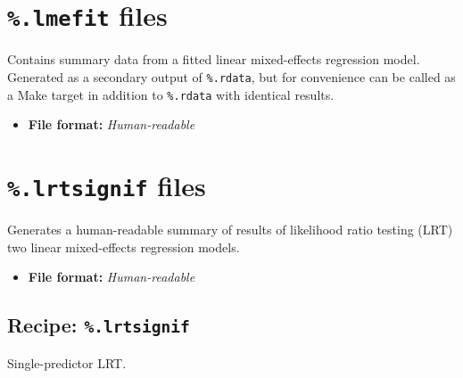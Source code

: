 \documentclass[12pt]{report}
\def\blue{\color{blue}}
\begin{document}
\section{{\blue\tt \%.lmefit} files}

Contains summary data from a fitted linear mixed-effects regression model. Generated as a secondary output of {\blue\tt \%.rdata}, but for convenience can be called as a Make target in addition to {\blue \tt \%.rdata} with identical results.

\begin{itemize}
\item\textbf{File format:} \textit{Human-readable}
\end{itemize}

\section{{\blue\tt \%.lrtsignif} files}

Generates a human-readable summary of results of likelihood ratio testing (LRT) two linear mixed-effects regression models.

\begin{itemize}
\item\textbf{File format:} \textit{Human-readable}
\end{itemize}

\subsection{Recipe: {\blue\tt \%.lrtsignif}}
Single-predictor LRT.
\end{document}
